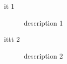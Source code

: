 \documentclass{report}
\begin{document}
\begin{description}
\item[it 1] description 1
\item[ittt 2] description 2
\end{description}
\end{document}
